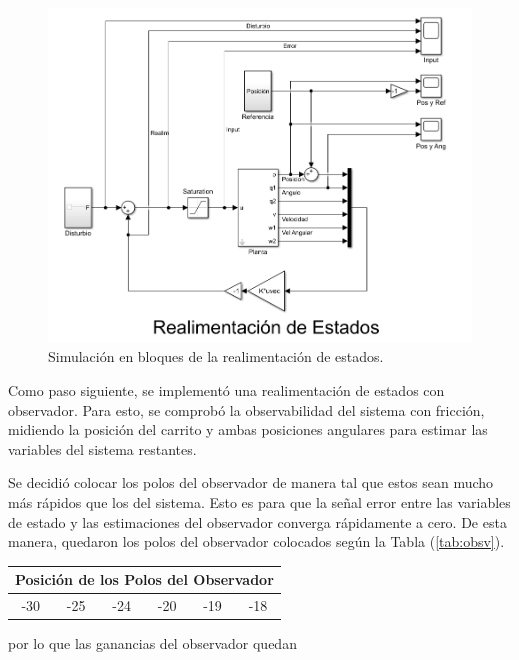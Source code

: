 \begin{figure}[H]
	\centering
	\includegraphics[width=\linewidth]{../Modelo de Control/ImagenesModelo de Control/realim.png}
	\caption{Simulación en bloques de la realimentación de estados.}	
	\label{fig:realim}
\end{figure}


Como paso siguiente, se implementó una realimentación de estados con observador. Para esto, se comprobó la observabilidad del sistema con fricción, midiendo la posición del carrito y ambas posiciones angulares para estimar las variables del sistema restantes.

Se decidió colocar los polos del observador de manera tal que estos sean mucho más rápidos que los del sistema. Esto es para que la señal error entre las variables de estado y las estimaciones del observador converga rápidamente a cero. De esta manera, quedaron los polos del observador colocados según la Tabla (\ref{tab:obsv}).

\begin{table}[H]
\centering
\begin{tabular}{@{}cccccc@{}}
\toprule
\multicolumn{6}{c}{Posición de los Polos del Observador} \\ \midrule
-30    & -25    & -24    & -20    & -19    & -18   \\ \bottomrule
\end{tabular}
\end{table}
\label{tab:obsv}

por lo que las ganancias del observador quedan

